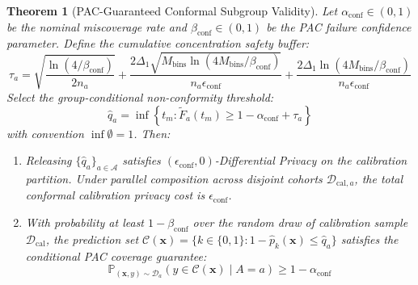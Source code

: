 \documentclass[pdflatex,sn-vancouver-num,referee,lineno]{sn-jnl}
\theoremstyle{thmstyleone}
\newtheorem{theorem}{Theorem}
\theoremstyle{thmstylethree}
\begin{document}
\begin{theorem}[PAC-Guaranteed Conformal Subgroup Validity]
\label{thm:conformal}
Let $\alpha_{\text{conf}} \in (0, 1)$ be the nominal miscoverage rate and $\beta_{\text{conf}} \in (0, 1)$ be the PAC failure confidence parameter. Define the cumulative concentration safety buffer:
\begin{equation}
    \label{eq:tau_a}
    \tau_a = \sqrt{\frac{\ln(4/\beta_{\text{conf}})}{2 n_a}} + \frac{2 \Delta_1 \sqrt{M_{\text{bins}} \ln(4M_{\text{bins}}/\beta_{\text{conf}})}}{n_a \epsilon_{\text{conf}}} + \frac{2 \Delta_1 \ln(4M_{\text{bins}}/\beta_{\text{conf}})}{n_a \epsilon_{\text{conf}}}
\end{equation}
Select the group-conditional non-conformity threshold:
\begin{equation}
    \hat{q}_a = \inf \left\{ t_m : \widetilde{F}_a(t_m) \ge 1 - \alpha_{\text{conf}} + \tau_a \right\}
\end{equation}
with convention $\inf \emptyset = 1$. Then:
\begin{enumerate}
    \item Releasing $\{\hat{q}_a\}_{a \in \mathcal{A}}$ satisfies $(\epsilon_{\text{conf}}, 0)$-Differential Privacy on the calibration partition. Under parallel composition across disjoint cohorts $\mathcal{D}_{\text{cal}, a}$, the total conformal calibration privacy cost is $\epsilon_{\text{conf}}$.
    \item With probability at least $1 - \beta_{\text{conf}}$ over the random draw of calibration sample $\mathcal{D}_{\text{cal}}$, the prediction set $\mathcal{C}(\mathbf{x}) = \{k \in \{0, 1\} : 1 - \hat{p}_k(\mathbf{x}) \le \hat{q}_a\}$ satisfies the conditional PAC coverage guarantee:
    \begin{equation}
        \mathbb{P}_{(\mathbf{x}, y) \sim \mathcal{D}_a}\left( y \in \mathcal{C}(\mathbf{x}) \mid A = a \right) \ge 1 - \alpha_{\text{conf}}
    \end{equation}
\end{enumerate}
\end{theorem}
\end{document}
